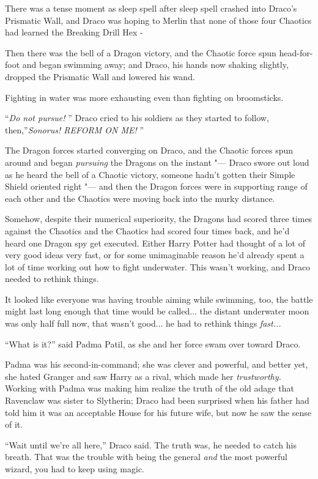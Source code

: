 There was a tense moment as sleep spell after sleep spell crashed into
Draco's Prismatic Wall, and Draco was hoping to Merlin that none of
those four Chaotics had learned the Breaking Drill Hex -

Then there was the bell of a Dragon victory, and the Chaotic force spun
head-for-foot and began swimming away; and Draco, his hands now shaking
slightly, dropped the Prismatic Wall and lowered his wand.

Fighting in water was more exhausting even than fighting on broomsticks.

``\emph{Do not pursue!} '' Draco cried to his soldiers as they started to
follow, then,''\emph{Sonorus! REFORM ON ME!} ''

The Dragon forces started converging on Draco, and the Chaotic forces
spun around and began \emph{pursuing} the Dragons on the instant "--- Draco
swore out loud as he heard the bell of a Chaotic victory, someone hadn't
gotten their Simple Shield oriented right "--- and then the Dragon forces
were in supporting range of each other and the Chaotics were moving back
into the murky distance.

Somehow, despite their numerical superiority, the Dragons had scored
three times against the Chaotics and the Chaotics had scored four times
back, and he'd heard one Dragon spy get executed. Either Harry Potter
had thought of a lot of very good ideas very fast, or for some
unimaginable reason he'd already spent a lot of time working out how to
fight underwater. This wasn't working, and Draco needed to rethink
things.

It looked like everyone was having trouble aiming while swimming, too,
the battle might last long enough that time would be called... the
distant underwater moon was only half full now, that wasn't good...
he had to rethink things \emph{fast...}

``What is it?'' said Padma Patil, as she and her force swam over toward
Draco.

Padma was his second-in-command; she was clever and powerful, and better
yet, she hated Granger and saw Harry as a rival, which made her
\emph{trustworthy.} Working with Padma was making him realize the truth
of the old adage that Ravenclaw was sister to Slytherin; Draco had been
surprised when his father had told him it was an acceptable House for
his future wife, but now he saw the sense of it.

``Wait until we're all here,'' Draco said. The truth was, he needed to
catch his breath. That was the trouble with being the general \emph{and}
the most powerful wizard, you had to keep using magic.

